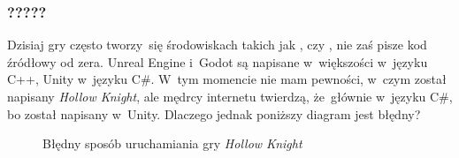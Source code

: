 \documentclass[10pt,t]{beamer}
\begin{document}
\begin{frame}
  \frametitle{?????}


  Dzisiaj gry często tworzy~się środowiskach takich jak
  ,
   czy
  , nie zaś pisze kod źródłowy
  od zera. Unreal Engine i~Godot są napisane w~większości w~języku C++,
  Unity w~języku C\#. W~tym momencie nie mam pewności, w~czym został
  napisany \textit{Hollow Knight}, ale mędrcy internetu twierdzą,
  że~głównie w~języku C\#, bo został napisany w~Unity. Dlaczego jednak
  poniższy diagram jest błędny?





  \begin{figure}

    \label{fig:Running-Hollow-Knight-good}


    \caption{Błędny sposób uruchamiania gry \textit{Hollow Knight}}


  \end{figure}

\end{frame}
\end{document}
